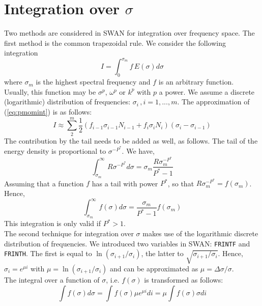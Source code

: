 \documentclass[12pt]{book}
\begin{document}
\section{Integration over $\sigma$}

Two methods are considered in SWAN for integration over frequency space. The first method is the common
trapezoidal rule. We consider the following integration
\begin{equation}
  I = \int_{0}^{\sigma_m} f\,E(\sigma)d\sigma
  \label{eq:pmomint}
\end{equation}
where $\sigma_m$ is the highest spectral frequency and $f$ is an arbitrary function. Usually, this function may be
$\sigma^p$, $\omega^p$ or $k^p$ with $p$ a power. We assume a discrete (logarithmic) distribution
of frequencies: $\sigma_{i}\, ,i=1,...,m$.
The approximation of (\ref{eq:pmomint}) is as follows:
\begin{equation}
  I \approx \sum_{2}^{m} \frac{1}{2}(f_{i-1} \sigma_{i-1} N_{i-1} + f_{i} \sigma_{i} N_{i})(\sigma_{i} - \sigma_{i-1})
\end{equation}
The contribution by the tail needs to be added as well, as follows. The tail of the energy density is proportional to $\sigma^{-P^*}$.
We have,
\begin{equation}
  \int_{\sigma_m}^{\infty} R \sigma^{-P^*} d\sigma = \sigma_{m} \frac{R \sigma_{m}^{-P^*}}{P^*-1}
\end{equation}
Assuming that a function $f$ has a tail with power $P^*$, so that $R \sigma_{m}^{-P^*} = f(\sigma_{m})$.
Hence,
\begin{equation}
  \int_{\sigma_m}^{\infty} f(\sigma)d\sigma = \frac{\sigma_{m}}{P^*-1} f(\sigma_{m})
\end{equation}
This integration is only valid if $P^* > 1$.
\\[2ex]
The second technique for integration over $\sigma$ makes use of the logarithmic discrete distribution of frequencies.
We introduced two variables in SWAN: {\tt FRINTF} and {\tt FRINTH}. The first is equal to
$\ln(\sigma_{i+1}/\sigma_{i})$, the latter to $\sqrt{\sigma_{i+1}/\sigma_{i}}$. Hence,
$\sigma_i = e^{\mu i}$ with $\mu = \ln(\sigma_{i+1}/\sigma_{i})$ and can be approximated as
$\mu = \Delta \sigma/\sigma$.
\\[2ex]
The integral over a function of $\sigma$, i.e. $f(\sigma)$ is transformed as follows:
\begin{equation}
  \int f(\sigma) d\sigma = \int f(\sigma) \mu e^{\mu i} di = \mu \int f(\sigma)\sigma di
\end{equation}
\end{document}
